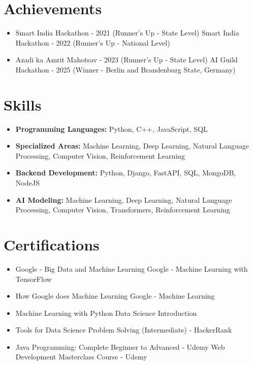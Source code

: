 \documentclass[a4paper,10pt]{article}
\begin{document}
\section*{Achievements}
\begin{itemize}
\item Smart India Hackathon - 2021 (Runner's Up - State Level) \hfill Smart India Hackathon - 2022 (Runner's Up - National Level)
\item Azadi ka Amrit Mahotsav - 2023 (Runner's Up - State Level) \hfill AI Guild Hackathon - 2025 (Winner - Berlin and Brandenburg State, Germany)
\end{itemize}

\section*{Skills}
\begin{itemize}
  \item \textbf{Programming Languages:} Python, C++, JavaScript, SQL
  \item \textbf{Specialized Areas:} Machine Learning, Deep Learning, Natural Language Processing, Computer Vision, Reinforcement Learning
  \item \textbf{Backend Development:} Python, Django, FastAPI, SQL, MongoDB, NodeJS
  \item \textbf{AI Modeling:} Machine Learning, Deep Learning, Natural Language Processing, Computer Vision, Transformers, Reinforcement Learning
\end{itemize}

\section*{Certifications}
\begin{itemize}
\item Google - Big Data and Machine Learning \hfill Google - Machine Learning with TensorFlow
\item How Google does Machine Learning \hfill Google - Machine Learning
\item Machine Learning with Python \hfill Data Science Introduction
\item Tools for Data Science \hfill Problem Solving (Intermediate) - HackerRank
\item Java Programming: Complete Beginner to Advanced - Udemy \hfill Web Development Masterclass Course - Udemy
\end{itemize}
\end{document}
